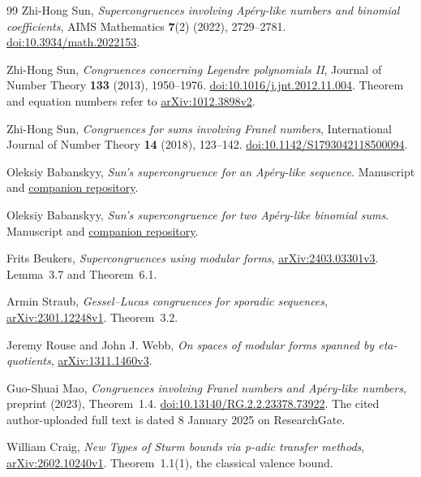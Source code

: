 \documentclass[11pt,a4paper]{article}
\theoremstyle{remark}
\begin{document}
\begin{thebibliography}{99}
Zhi-Hong Sun,
\emph{Supercongruences involving Ap\'ery-like numbers and binomial coefficients},
AIMS Mathematics \textbf{7}(2) (2022), 2729--2781.
\href{https://doi.org/10.3934/math.2022153}{doi:10.3934/math.2022153}.

Zhi-Hong Sun,
\emph{Congruences concerning Legendre polynomials II},
Journal of Number Theory \textbf{133} (2013), 1950--1976.
\href{https://doi.org/10.1016/j.jnt.2012.11.004}{doi:10.1016/j.jnt.2012.11.004}.
Theorem and equation numbers refer to
\href{https://arxiv.org/abs/1012.3898v2}{arXiv:1012.3898v2}.

Zhi-Hong Sun,
\emph{Congruences for sums involving Franel numbers},
International Journal of Number Theory \textbf{14} (2018), 123--142.
\href{https://doi.org/10.1142/S1793042118500094}{doi:10.1142/S1793042118500094}.

Oleksiy Babanskyy,
\emph{Sun's supercongruence for an Ap\'ery-like sequence}.
Manuscript and
\href{https://github.com/aconsciousfractal/Sun-3-5-Supercongruence}{companion repository}.

Oleksiy Babanskyy,
\emph{Sun's supercongruence for two Ap\'ery-like binomial sums}.
Manuscript and
\href{https://github.com/aconsciousfractal/Sun-3-6-Supercongruence}{companion repository}.

Frits Beukers,
\emph{Supercongruences using modular forms},
\href{https://arxiv.org/abs/2403.03301v3}{arXiv:2403.03301v3}.
Lemma~3.7 and Theorem~6.1.

Armin Straub,
\emph{Gessel--Lucas congruences for sporadic sequences},
\href{https://arxiv.org/abs/2301.12248v1}{arXiv:2301.12248v1}.
Theorem~3.2.

Jeremy Rouse and John J. Webb,
\emph{On spaces of modular forms spanned by eta-quotients},
\href{https://arxiv.org/abs/1311.1460v3}{arXiv:1311.1460v3}.

Guo-Shuai Mao,
\emph{Congruences involving Franel numbers and Ap\'ery-like numbers},
preprint (2023), Theorem~1.4.
\href{https://doi.org/10.13140/RG.2.2.23378.73922}{doi:10.13140/RG.2.2.23378.73922}.
The cited author-uploaded full text is dated 8 January 2025 on ResearchGate.

William Craig,
\emph{New Types of Sturm bounds via p-adic transfer methods},
\href{https://arxiv.org/abs/2602.10240v1}{arXiv:2602.10240v1}.
Theorem~1.1(1), the classical valence bound.


\end{thebibliography}
\end{document}
